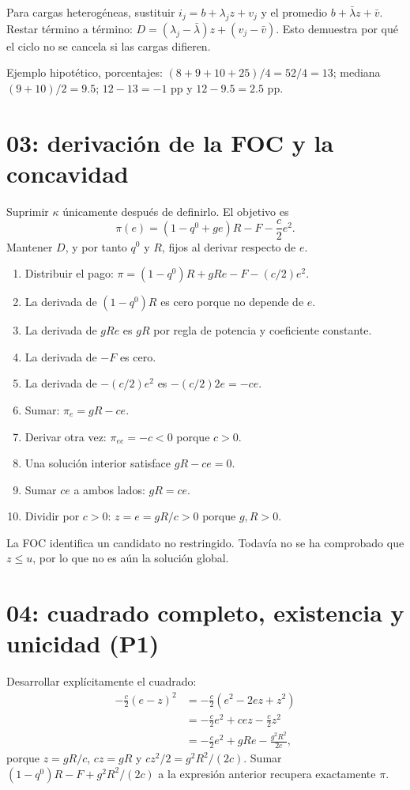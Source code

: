 \documentclass[11pt]{article}
\begin{document}
Para cargas heterogéneas, sustituir $i_j=b+\lambda_j z+v_j$ y el promedio
$b+\bar\lambda z+\bar v$. Restar término a término:
$D=(\lambda_j-\bar\lambda)z+(v_j-\bar v)$. Esto demuestra por qué el ciclo
no se cancela si las cargas difieren.

Ejemplo hipotético, porcentajes: $(8+9+10+25)/4=52/4=13$; mediana
$(9+10)/2=9.5$; $12-13=-1$ pp y $12-9.5=2.5$ pp.

\section{03: derivación de la FOC y la concavidad}
Suprimir $\kappa$ únicamente después de definirlo. El objetivo es
\[
\pi(e)=(1-q^0+ge)R-F-\frac c2e^2.
\]
Mantener $D$, y por tanto $q^0$ y $R$, fijos al derivar respecto de $e$.
\begin{enumerate}
\item Distribuir el pago: $\pi=(1-q^0)R+gRe-F-(c/2)e^2$.
\item La derivada de $(1-q^0)R$ es cero porque no depende de $e$.
\item La derivada de $gRe$ es $gR$ por regla de potencia y coeficiente constante.
\item La derivada de $-F$ es cero.
\item La derivada de $-(c/2)e^2$ es $-(c/2)2e=-ce$.
\item Sumar: $\pi_e=gR-ce$.
\item Derivar otra vez: $\pi_{ee}=-c<0$ porque $c>0$.
\item Una solución interior satisface $gR-ce=0$.
\item Sumar $ce$ a ambos lados: $gR=ce$.
\item Dividir por $c>0$: $z=e=gR/c>0$ porque $g,R>0$.
\end{enumerate}
La FOC identifica un candidato no restringido. Todavía no se ha comprobado
que $z\le u$, por lo que no es aún la solución global.

\section{04: cuadrado completo, existencia y unicidad (P1)}
Desarrollar explícitamente el cuadrado:
\begin{align*}
-\frac c2(e-z)^2
 &=-\frac c2(e^2-2ez+z^2)\\
 &=-\frac c2e^2+cez-\frac c2z^2\\
 &=-\frac c2e^2+gRe-\frac{g^2R^2}{2c},
\end{align*}
porque $z=gR/c$, $cz=gR$ y $cz^2/2=g^2R^2/(2c)$. Sumar
$(1-q^0)R-F+g^2R^2/(2c)$ a la expresión anterior recupera exactamente $\pi$.
\end{document}
